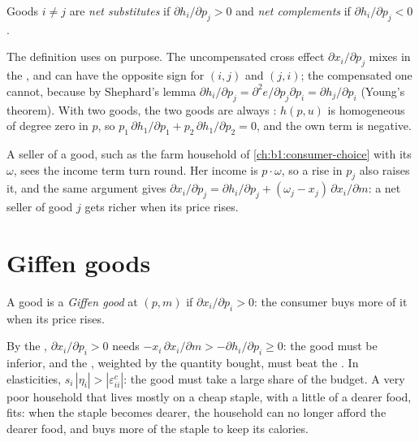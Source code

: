 \begin{definition}\label{def:b1:income-and-substitution-effects:net}
Goods $i \neq j$ are \emph{net substitutes} if $\partial h_i/\partial p_j > 0$
and \emph{net complements} if $\partial h_i/\partial p_j < 0$.
\end{definition}

The definition uses  on purpose. The uncompensated cross
effect $\partial x_i/\partial p_j$ mixes in the , and can have
the opposite sign for $(i, j)$ and $(j, i)$; the compensated one cannot,
because by Shephard's lemma
$\partial h_i/\partial p_j = \partial^2e/\partial p_j\partial p_i = \partial h_j/\partial p_i$
(Young's theorem). With two goods, the two goods are always : $h(p, u)$ is homogeneous of degree zero in $p$, so
$p_1\,\partial h_1/\partial p_1 + p_2\,\partial h_1/\partial p_2 = 0$, and the
own term is negative.

A seller of a good, such as the farm household of
\cref{ch:b1:consumer-choice} with its  $\omega$, sees the income term
turn round. Her income is $p\cdot\omega$, so a rise in $p_j$ also raises it,
and the same argument gives
$\partial x_i/\partial p_j = \partial h_i/\partial p_j + (\omega_j - x_j)\,\partial x_i/\partial m$:
a net seller of good $j$ gets richer when its price rises.

\section{Giffen goods}\label{sec:b1:income-and-substitution-effects:giffen}

\begin{definition}\label{def:b1:income-and-substitution-effects:giffen}
A good is a \emph{Giffen good} at $(p, m)$ if $\partial x_i/\partial p_i > 0$:
the consumer buys more of it when its price rises.
\end{definition}

By the , $\partial x_i/\partial p_i > 0$ needs
$-x_i\,\partial x_i/\partial m > -\partial h_i/\partial p_i \ge 0$: the good
must be inferior, and the , weighted by the quantity bought,
must beat the . In elasticities,
$s_i\,|\eta_i| > |\varepsilon^{c}_{ii}|$: the good must take a large share of
the budget. A very poor household that lives mostly on a cheap staple,
with a little of a dearer food, fits: when the staple becomes dearer, the
household can no longer afford the dearer food, and buys more of the
staple to keep its calories.

